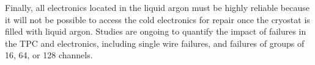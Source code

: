 Finally, all electronics located in the liquid argon must be highly reliable because it will not be possible to access the cold electronics for repair once the cryostat is filled with liquid argon. Studies are ongoing to quantify the impact of failures in the TPC and electronics, including single wire failures, and failures of groups of 16, 64, or 128 channels.




